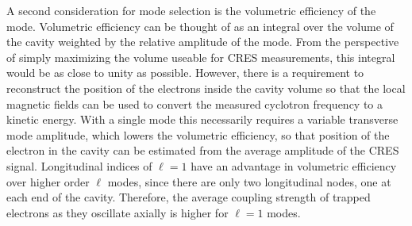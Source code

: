 A second consideration for mode selection is the volumetric efficiency of the mode. Volumetric efficiency can be thought of as an integral over the volume of the cavity weighted by the relative amplitude of the mode. From the perspective of simply maximizing the volume useable for CRES measurements, this integral would be as close to unity as possible. However, there is a requirement to reconstruct the position of the electrons inside the cavity volume so that the local magnetic fields can be used to convert the measured cyclotron frequency to a kinetic energy. With a single mode this necessarily requires a variable transverse mode amplitude, which lowers the volumetric efficiency, so that position of the electron in the cavity can be estimated from the average amplitude of the CRES signal. Longitudinal indices of $\ell=1$ have an advantage in volumetric efficiency over higher order $\ell$ modes, since there are only two longitudinal nodes, one at each end of the cavity. Therefore, the average coupling strength of trapped electrons as they oscillate axially is higher for $\ell=1$ modes.


